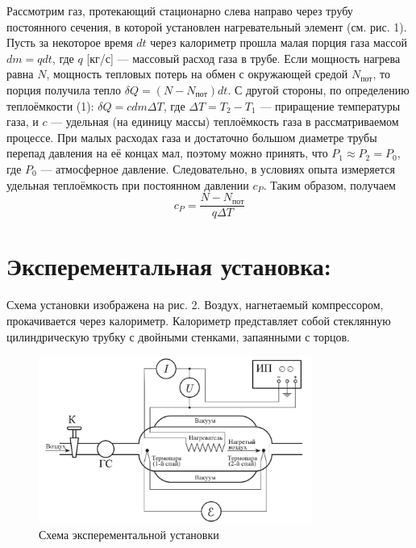 \documentclass[a4paper,12pt]{article}
\begin{document}
Рассмотрим газ, протекающий стационарно слева направо через трубу постоянного сечения, в которой установлен нагревательный элемент (см. рис. 1). Пусть за некоторое
время $dt$ через калориметр прошла
малая порция газа массой $dm=q dt$,
где $q$ [кг/с] — массовый расход газа в трубе. Если мощность нагрева равна $N$, мощность тепловых потерь на обмен с окружающей средой $N_{пот}$, то порция
получила тепло $\delta Q = (N-N_{пот})dt$. С другой стороны, по определению теплоёмкости (1): $\delta Q = c dm \Delta T$, где $\Delta T = T_{2}-T_{1}$ — приращение температуры	газа, и $c$ — удельная (на единицу массы) теплоёмкость газа в рассматриваемом процессе. При малых расходах газа и достаточно большом диаметре
трубы перепад давления на её концах мал, поэтому можно принять, что $P_{1} \approx P_{2} = P_{0}$, где $P_{0}$ — атмосферное давление. Следовательно, в условиях опыта
измеряется удельная теплоёмкость при постоянном давлении $c_{P}$. Таким образом, получаем
\begin{equation}
    c_{P} = \frac{N-N_{пот}}{q\Delta T}
\end{equation}
		 
\section{Эксперементальная установка:}
	
Схема установки изображена на рис. 2. Воздух, нагнетаемый компрессором, прокачивается через калориметр. Калориметр представляет собой стеклянную цилиндрическую трубку с двойными стенками, запаянными с торцов.
	
\begin{figure}[H]
	\begin{center}
    \includegraphics[width=0.8\textwidth]{lab_2_1_1_ust.png}
    \end{center}
    \caption{Схема эксперементальной установки}
\end{figure}
        
\end{document}
